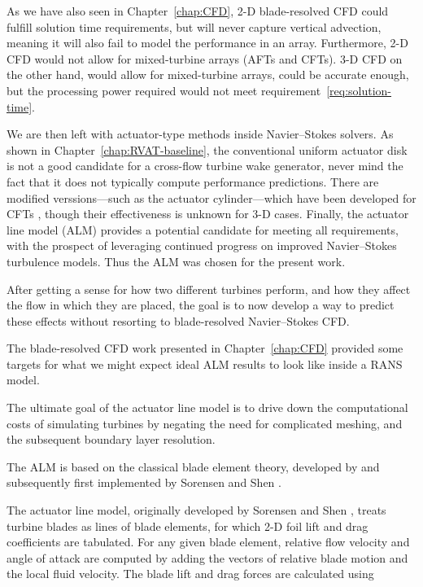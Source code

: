 As we have also seen in Chapter~\ref{chap:CFD}, 2-D blade-resolved CFD could
fulfill solution time requirements, but will never capture vertical advection,
meaning it will also fail to model the performance in an array. Furthermore, 2-D
CFD would not allow for mixed-turbine arrays (AFTs and CFTs). 3-D CFD on the
other hand, would allow for mixed-turbine arrays, could be accurate enough, but
the processing power required would not meet
requirement~\ref{req:solution-time}.

We are then left with actuator-type methods inside Navier--Stokes solvers. As
shown in Chapter~\ref{chap:RVAT-baseline}, the conventional uniform actuator
disk is not a good candidate for a cross-flow turbine wake generator, never mind
the fact that it does not typically compute performance predictions. There are
modified verssions---such as the actuator cylinder---which have been developed
for CFTs \cite{Shamsoddin2014}, though their effectiveness is unknown for 3-D
cases. Finally, the actuator line model (ALM) provides a potential candidate for
meeting all requirements, with the prospect of leveraging continued progress on
improved Navier--Stokes turbulence models. Thus the ALM was chosen for the
present work.

After getting a sense for how two different turbines perform, and how they
affect the flow in which they are placed, the goal is to now develop a way to
predict these effects without resorting to blade-resolved Navier--Stokes CFD.

The blade-resolved CFD work presented in Chapter~\ref{chap:CFD} provided some
targets for what we might expect ideal ALM results to look like inside a RANS
model.

The ultimate goal of the actuator line model is to drive down the computational
costs of simulating turbines by negating the need for complicated meshing, and
the subsequent boundary layer resolution.

The ALM is based on the classical blade element theory, developed by
and subsequently first implemented by Sorensen and Shen \cite{Sorensen2002}.


The actuator line model, originally developed by Sorensen and Shen
\cite{Sorensen2002}, treats turbine blades as lines of blade elements, for which
2-D foil lift and drag coefficients are tabulated. For any given blade element,
relative flow velocity and angle of attack are computed by adding the vectors
of relative blade motion and the local fluid velocity. The blade lift and drag
forces are calculated using

